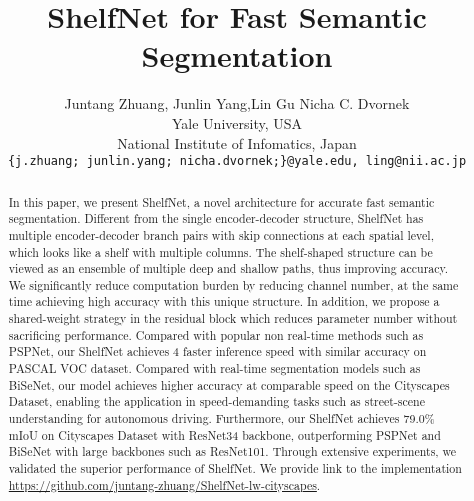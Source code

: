 \documentclass[10pt,twocolumn,letterpaper]{article}
\begin{document}
\title{ShelfNet for Fast Semantic Segmentation}
\author{Juntang Zhuang, \quad Junlin Yang,\quad  Lin Gu \quad Nicha C. Dvornek \\
 Yale University, USA  \\  National Institute of Infomatics, Japan \\
{\tt\small \{j.zhuang; junlin.yang; nicha.dvornek;\}@yale.edu, ling@nii.ac.jp}
}

\maketitle



\begin{abstract}
In this paper, we present ShelfNet, a novel architecture for accurate fast semantic segmentation. Different from the single encoder-decoder structure, ShelfNet has multiple encoder-decoder branch pairs with skip connections at each spatial level, which looks like a shelf with multiple columns. The shelf-shaped structure can be viewed as an ensemble of multiple deep and shallow paths, thus improving accuracy. We significantly reduce computation burden by reducing channel number, at the same time achieving high accuracy with this unique structure. In addition, we propose a shared-weight strategy in the residual block which reduces parameter number without sacrificing performance. Compared with popular non real-time methods such as PSPNet, our ShelfNet achieves 4 faster inference speed with similar accuracy on PASCAL VOC dataset. Compared with real-time segmentation models such as BiSeNet, our model achieves higher accuracy at comparable speed on the Cityscapes Dataset, enabling the application in speed-demanding tasks such as street-scene understanding for autonomous driving. Furthermore, our ShelfNet achieves 79.0\% mIoU on Cityscapes Dataset with ResNet34 backbone, outperforming PSPNet and BiSeNet with large backbones such as ResNet101. Through extensive experiments, we validated the superior performance of ShelfNet. We provide link to the implementation \url{https://github.com/juntang-zhuang/ShelfNet-lw-cityscapes}.
\end{abstract}
\end{document}
